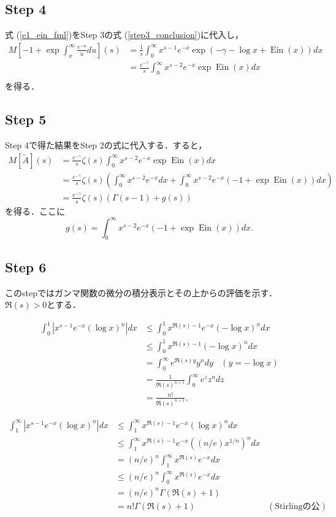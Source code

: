 \documentclass{jsarticle}
\newcommand{\Ein}{\operatorname{Ein}}
\theoremstyle{definition}
\begin{document}
\subsection*{Step 4}

式 (\ref{e1_ein_fml})をStep 3の式 (\ref{step3_conclusion})に代入し，
\begin{align*}
M\left[ -1 + \exp \int_{x}^\infty \frac{e^{-u}}{u} du \right](s) &= \frac{1}{s} \int_0^\infty x^{s-1} e^{-x}  \exp \left(-\gamma-\log x+\Ein(x)\right)  dx \\
&= \frac{e^{-\gamma}}{s} \int_0^\infty x^{s-2} e^{-x}  \exp \Ein(x) dx \\
\end{align*}
を得る．

\subsection*{Step 5}
Step 4で得た結果をStep 2の式に代入する．すると，
\begin{align*}
M[\tilde{A}](s) &= \frac{e^{-\gamma}}{s} \zeta(s) \int_0^\infty x^{s-2} e^{-x}  \exp \Ein(x) dx \\
&= \frac{e^{-\gamma}}{s} \zeta(s) \left(\int_0^\infty x^{s-2} e^{-x} dx + \int_0^\infty x^{s-2} e^{-x} (-1 + \exp \Ein(x)) dx \right) \\
&= \frac{e^{-\gamma}}{s} \zeta(s) (\Gamma(s-1) + g(s))
\end{align*}
を得る．ここに
\[ g(s) = \int_0^\infty x^{s-2} e^{-x} (-1 + \exp \Ein(x)) dx. \]

\subsection*{Step 6}
このstepではガンマ関数の微分の積分表示とその上からの評価を示す．
$\Re(s) > 0$とする．

\begin{align*}
\int_0^1 |x^{s-1} e^{-x} (\log x)^n| dx &\le \int_0^1 x^{\Re(s)-1} e^{-x} (- \log x)^n dx \\
&\le \int_0^1 x^{\Re(s)-1} (- \log x)^n dx \\
&= \int_0^\infty e^{\Re(s) y} y^n dy\ \ \ \ (y = - \log x) \\
&= \frac{1}{\Re(s)^{n+1}} \int_0^\infty e^{z} z^n dz \\
&= \frac{n!}{\Re(s)^{n+1}}.
\end{align*}

\begin{align*}
\int_1^\infty |x^{s-1} e^{-x} (\log x)^n| dx &\le \int_1^\infty x^{\Re(s)-1} e^{-x} (\log x)^n dx \\
&\le \int_1^\infty x^{\Re(s)-1} e^{-x} ((n/e) x^{1/n})^n dx \\
&= (n/e)^n \int_1^\infty x^{\Re(s)} e^{-x} dx \\
&\le (n/e)^n \int_0^\infty x^{\Re(s)} e^{-x} dx \\
&= (n/e)^n \Gamma(\Re(s)+1) \\
&= n! \Gamma(\Re(s)+1) & (\text{Stirlingの公式}).
\end{align*}
\end{document}
